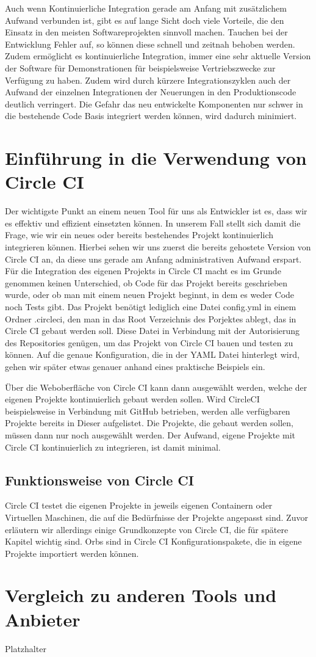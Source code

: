 \documentclass{article}
\begin{document}
Auch wenn Kontinuierliche Integration gerade am Anfang mit zusätzlichem Aufwand verbunden ist, gibt es auf lange Sicht doch viele Vorteile, die den Einsatz in den meisten Softwareprojekten sinnvoll machen.
Tauchen bei der Entwicklung Fehler auf, so können diese schnell und zeitnah behoben werden.
Zudem ermöglicht es kontinuierliche Integration, immer eine sehr aktuelle Version der Software für Demonstrationen für beispielsweise Vertriebszwecke zur Verfügung zu haben. Zudem wird durch kürzere Integrationszyklen auch der Aufwand der einzelnen Integrationen der Neuerungen in den Produktionscode deutlich verringert.
Die Gefahr das neu entwickelte Komponenten nur schwer in die bestehende Code Basis integriert werden können, wird dadurch minimiert.

\section{Einführung in die Verwendung von Circle CI}
Der wichtigste Punkt an einem neuen Tool für uns als Entwickler ist es, dass wir es effektiv und effizient einsetzten können. In unserem Fall stellt sich damit die Frage, wie wir ein neues oder bereits bestehendes Projekt kontinuierlich integrieren können. Hierbei sehen wir uns zuerst die bereits gehostete Version von Circle CI an, da diese uns gerade am Anfang administrativen Aufwand erspart. Für die Integration des eigenen Projekts in Circle CI macht es im Grunde genommen keinen Unterschied, ob Code für das Projekt bereits geschrieben wurde, oder ob man mit einem neuen Projekt beginnt, in dem es weder Code noch Tests gibt. Das Projekt benötigt lediglich eine Datei config.yml in einem Ordner .circleci, den man in das Root Verzeichnis des Porjektes ablegt, das in Circle CI gebaut werden soll. Diese Datei in Verbindung mit der Autorisierung des Repositories genügen, um das Projekt von Circle CI bauen und testen zu können. Auf die genaue Konfiguration, die in der YAML Datei hinterlegt wird, gehen wir später etwas genauer anhand eines praktische Beispiels ein.

Über die Weboberfläche von Circle CI kann dann ausgewählt werden, welche der eigenen Projekte kontinuierlich gebaut werden sollen. Wird CircleCI beispielsweise in Verbindung mit GitHub betrieben, werden alle verfügbaren Projekte bereits in Dieser aufgelistet. Die Projekte, die gebaut werden sollen, müssen dann nur noch ausgewählt werden. Der Aufwand, eigene Projekte mit Circle CI kontinuierlich zu integrieren, ist damit minimal. 

\subsection{Funktionsweise von Circle CI}
Circle CI testet die eigenen Projekte in jeweils eigenen Containern oder Virtuellen Maschinen, die auf die Bedürfnisse der Projekte angepasst sind. Zuvor erläutern wir allerdings einige Grundkonzepte von Circle CI, die für spätere Kapitel wichtig sind.
Orbs sind in Circle CI Konfigurationspakete, die in eigene Projekte importiert werden können.


\section {Vergleich zu anderen Tools und Anbieter}
Platzhalter
\end{document}
